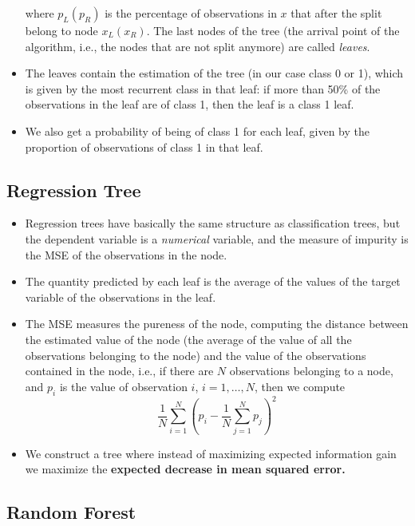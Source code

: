 \begin{itemize}
          where $p_{L}(p_{R})$ is the percentage of observations in $x$ that after the split belong to node $x_{L}(x_{R})$. The last nodes of the tree (the arrival point of the algorithm, i.e., the nodes that are not split anymore) are called \textit{leaves}. 
    \item The leaves contain the estimation of the tree (in our case class 0 or 1), which is given by the most recurrent class in that leaf: if more than 50\% of the observations in the leaf are of class 1, then the leaf is a class 1 leaf.
    \item We also get a probability of being of class 1 for each leaf, given by the proportion of observations of class 1 in that leaf.
\end{itemize}

\subsection{Regression Tree}

\begin{itemize}
    \item Regression trees have basically the same structure as classification trees, but the dependent variable is a \emph{numerical} variable, and the measure of impurity is the MSE of the observations in the node. 
    \item The quantity predicted by each leaf is the average of the values of the target variable of the observations in the leaf.
    \item The MSE measures the pureness of the node, computing the distance between the estimated value of the node (the average of the value of all the observations belonging to the node) and the value of the observations contained in the node, i.e., if there are $N$ observations belonging to a node, and $p_i$ is the value of observation $i$, $i=1,\dotsc,N$, then we compute
          \begin{equation*}
              \frac{1}{N}\sum\limits _{i=1}^{N}\left(p_{i} -\frac{1}{N}\sum\limits _{j=1}^{N} p_{j}\right)^{2}
          \end{equation*}
    \item We construct a tree where instead of maximizing expected information gain we maximize the \textbf{expected decrease in mean squared error.}
\end{itemize}

\subsection{Random Forest}

